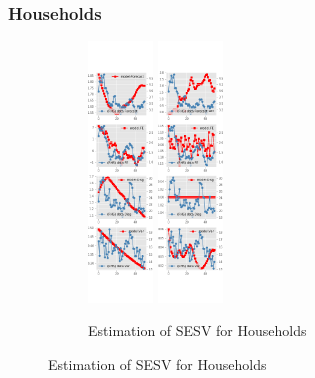 \documentclass[]{article}
\begin{document}
\subsubsection{Households}


\begin{figure}[ht]
	\centering
	\begin{subfigure}[b]{\textwidth}
		\centering
		\caption{Estimation of SESV for Households}
		\label{SESV_diag_SCE}
		\includegraphics[width=0.19\textwidth]{figures/sce_se_est_sv_diag0.png}
		\includegraphics[width=0.19\textwidth]{figures/sce_se_est_sv_diag1.png}

\end{subfigure}
\end{figure}
\end{document}
